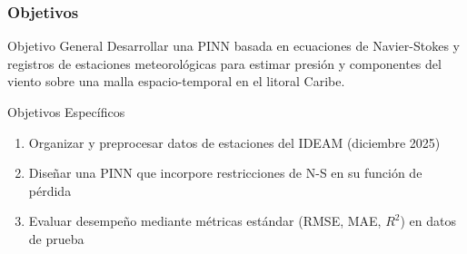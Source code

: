 \begin{frame}[fragile]
  \frametitle{Objetivos}
  
  \begin{block}{Objetivo General}
    Desarrollar una PINN basada en ecuaciones de Navier-Stokes y registros de estaciones meteorológicas para estimar presión y componentes del viento sobre una malla espacio-temporal en el litoral Caribe.
  \end{block}
  
  \begin{block}{Objetivos Específicos}
    \begin{enumerate}
      \item \textcolor{ColorVerdeOliva}{Organizar y preprocesar} datos de estaciones del IDEAM (diciembre 2025)
      \item \textcolor{ColorVerdeOliva}{Diseñar una PINN} que incorpore restricciones de N-S en su función de pérdida
      \item \textcolor{ColorVerdeOliva}{Evaluar desempeño} mediante métricas estándar (\alert{RMSE, MAE, $R^2$}) en datos de prueba
    \end{enumerate}
  \end{block}
  
\end{frame}
